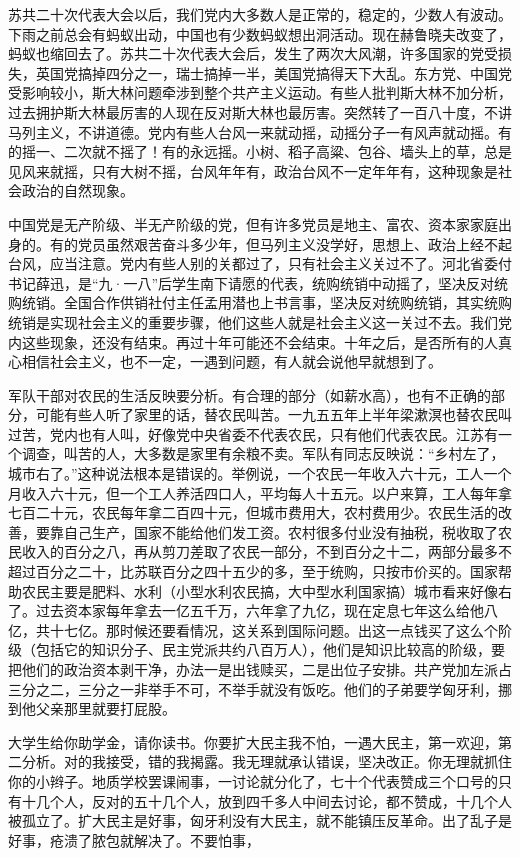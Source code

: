 苏共二十次代表大会以后，我们党内大多数人是正常的，稳定的，少数人有波动。下雨之前总会有蚂蚁出动，中国也有少数蚂蚁想出洞活动。现在赫鲁晓夫改变了，蚂蚁也缩回去了。苏共二十次代表大会后，发生了两次大风潮，许多国家的党受损失，英国党搞掉四分之一，瑞士搞掉一半，美国党搞得天下大乱。东方党、中国党受影响较小，斯大林问题牵涉到整个共产主义运动。有些人批判斯大林不加分析，过去拥护斯大林最厉害的人现在反对斯大林也最厉害。突然转了一百八十度，不讲马列主义，不讲道德。党内有些人台风一来就动摇，动摇分子一有风声就动摇。有的摇一、二次就不摇了！有的永远摇。小树、稻子高粱、包谷、墙头上的草，总是见风来就摇，只有大树不摇，台风年年有，政治台风不一定年年有，这种现象是社会政治的自然现象。

中国党是无产阶级、半无产阶级的党，但有许多党员是地主、富农、资本家家庭出身的。有的党员虽然艰苦奋斗多少年，但马列主义没学好，思想上、政治上经不起台风，应当注意。党内有些人别的关都过了，只有社会主义关过不了。河北省委付书记薛迅，是“九·一八”后学生南下请愿的代表，统购统销中动摇了，坚决反对统购统销。全国合作供销社付主任孟用潜也上书言事，坚决反对统购统销，其实统购统销是实现社会主义的重要步骤，他们这些人就是社会主义这一关过不去。我们党内这些现象，还没有结束。再过十年可能还不会结束。十年之后，是否所有的人真心相信社会主义，也不一定，一遇到问题，有人就会说他早就想到了。

军队干部对农民的生活反映要分析。有合理的部分（如薪水高），也有不正确的部分，可能有些人听了家里的话，替农民叫苦。一九五五年上半年梁漱溟也替农民叫过苦，党内也有人叫，好像党中央省委不代表农民，只有他们代表农民。江苏有一个调查，叫苦的人，大多数是家里有余粮不卖。军队有同志反映说：“乡村左了，城市右了。”这种说法根本是错误的。举例说，一个农民一年收入六十元，工人一个月收入六十元，但一个工人养活四口人，平均每人十五元。以户来算，工人每年拿七百二十元，农民每年拿二百四十元，但城市费用大，农村费用少。农民生活的改善，要靠自己生产，国家不能给他们发工资。农村很多付业没有抽税，税收取了农民收入的百分之八，再从剪刀差取了农民一部分，不到百分之十二，两部分最多不超过百分之二十，比苏联百分之四十五少的多，至于统购，只按市价买的。国家帮助农民主要是肥料、水利（小型水利农民搞，大中型水利国家搞）城市看来好像右了。过去资本家每年拿去一亿五千万，六年拿了九亿，现在定息七年这么给他八亿，共十七亿。那时候还要看情况，这关系到国际问题。出这一点钱买了这么个阶级（包括它的知识分子、民主党派共约八百万人），他们是知识比较高的阶级，要把他们的政治资本剥干净，办法一是出钱赎买，二是出位子安排。共产党加左派占三分之二，三分之一非举手不可，不举手就没有饭吃。他们的子弟要学匈牙利，挪到他父亲那里就要打屁股。

大学生给你助学金，请你读书。你要扩大民主我不怕，一遇大民主，第一欢迎，第二分析。对的我接受，错的我揭露。我无理就承认错误，坚决改正。你无理就抓住你的小辫子。地质学校罢课闹事，一讨论就分化了，七十个代表赞成三个口号的只有十几个人，反对的五十几个人，放到四千多人中间去讨论，都不赞成，十几个人被孤立了。扩大民主是好事，匈牙利没有大民主，就不能镇压反革命。出了乱子是好事，疮溃了脓包就解决了。不要怕事，

